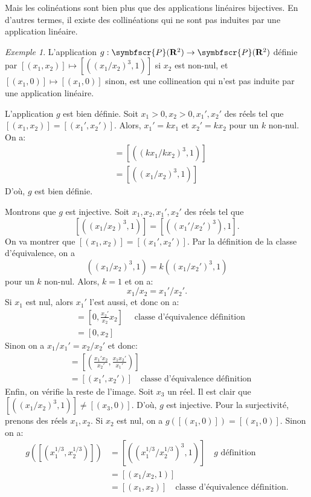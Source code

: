 \documentclass[10pt, oneside]{memoir}
\theoremstyle{definition}
\theoremstyle{remark}
\newtheorem{exm}{Exemple}
\newcommand{\proj}{\symbfscr{P}}
\newcommand{\R}{\mathbf{R}}
\begin{document}
Mais les colinéations sont bien plus que des applications linéaires bijectives.
En d'autres termes, il existe des collinéations qui ne sont pas induites par une
application linéaire.
\begin{exm}
  L'application $g: \proj(\R^2) \to \proj(\R^2)$ définie par
  $[(x_1, x_2)] \mapsto [((x_{1} / x_{2})^3, 1)]$ si $x_{2}$ est non-nul, et
  $[(x_{1}, 0)] \mapsto [(x_{1}, 0)]$ sinon, est une collineation qui n'est pas
  induite par une application linéaire.

  L'application $g$ est bien définie. Soit $x_{1} > 0, x_{2} > 0, x_{1}', x_{2}'$ des
  réels tel que
  $[(x_{1}, x_{2})] = [(x_{1}', x_{2}')]$. Alors, $x_{1}' = kx_{1}$ et
  $x_{2}' = kx_{2}$ pour un $k$ non-nul. On a:
  \begin{align*}
    [((x_{1}' / x_{2}')^{3}, 1)] &= [((kx_{1} / kx_{2})^{3}, 1)] \\
                                 &= [((x_{1} / x_{2})^{3}, 1)]
  \end{align*}
  D'où, $g$ est bien définie.

  Montrons que $g$ est injective. Soit $x_{1}, x_{2}, x_{1}', x_{2}'$ des réels
  tel que
  $$
  [((x_{1} / x_{2})^{3}, 1)] = [((x_{1}' / x_{2}')^{3}), 1].
  $$
  On va montrer que $[(x_{1}, x_{2})] = [(x_{1}', x_{2}')]$. Par la définition
  de la classe d'équivalence, on a
  $$
  ((x_{1} / x_{2})^{3}, 1) = k ((x_{1} / x_{2}')^{3}, 1)
  $$
  pour un $k$ non-nul. Alors, $k = 1$ et on a:
  $$
  x_{1} / x_{2} = x_{1}' / x_{2}'.
  $$
  Si $x_{1}$ est nul, alors $x_{1}'$ l'est aussi, et donc on a:
  \begin{align*}
    [(0, x_{2})] &= [0, \frac{x_{2}'}{x_{2}} x_{2}] \quad \text{ classe
                   d'équivalence définition} \\
                 &= [0, x_{2}]
  \end{align*}
  Sinon on a $x_{1} / x_{1}' = x_{2} / x_{2}'$ et donc:
  \begin{align*}
    [(x_{1}, x_{2})] &= [(\frac{x_{1}' x_{2}}{x_{2}'}, \frac{x_{1} x_{2}'}{x_{1}'})] \\
                     &= [(x_{1}', x_{2}')] \quad \text{classe d'équivalence définition}
  \end{align*}
  Enfin, on vérifie la reste de l'image. Soit $x_{3}$ un réel. Il est clair que
  $[((x_{1} / x_{2})^{3}, 1)] \neq [(x_{3}, 0)]$. D'où, $g$ est injective. Pour
  la surjectivité, prenons des réels $x_{1}, x_{2}$. Si $x_{2}$ est nul, on a
  $g([(x_{1}, 0)]) = [(x_{1}, 0)]$. Sinon on a:
  \begin{align*}
    g([(x_{1}^{1/3}, x_{2}^{1/3})]) &= [((x_{1}^{1/3} / x_{2}^{1/3})^{3}, 1)]
                                      \quad \text{$g$ définition} \\
                                    &= [(x_{1} / x_{2}, 1)] \\
                                    &= [(x_{1}, x_{2})]
                                     \quad \text{classe d'équivalence définition}.
  \end{align*}


\end{exm}
\end{document}

